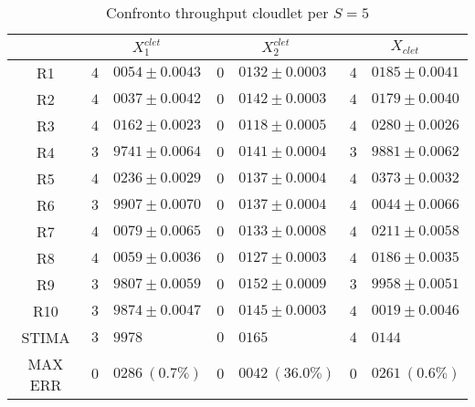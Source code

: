 \begin{table}[!h]
\begin{tabular}{c|r@{.}l|r@{.}l|r@{.}l}
& \multicolumn{2}{|c|}{$X_1^{clet}$}
& \multicolumn{2}{|c|}{$X_2^{clet}$}
& \multicolumn{2}{|c}{$X_{clet}$} 
\\          
\hline
R1      & $4$&$0054 \pm 0.0043$ & $0$&$0132 \pm 0.0003$ & $4$&$0185 \pm 0.0041$ \\
R2      & $4$&$0037 \pm 0.0042$ & $0$&$0142 \pm 0.0003$ & $4$&$0179 \pm 0.0040$ \\
R3      & $4$&$0162 \pm 0.0023$ & $0$&$0118 \pm 0.0005$ & $4$&$0280 \pm 0.0026$ \\
R4      & $3$&$9741 \pm 0.0064$ & $0$&$0141 \pm 0.0004$ & $3$&$9881 \pm 0.0062$ \\
R5      & $4$&$0236 \pm 0.0029$ & $0$&$0137 \pm 0.0004$ & $4$&$0373 \pm 0.0032$ \\
R6      & $3$&$9907 \pm 0.0070$ & $0$&$0137 \pm 0.0004$ & $4$&$0044 \pm 0.0066$ \\
R7      & $4$&$0079 \pm 0.0065$ & $0$&$0133 \pm 0.0008$ & $4$&$0211 \pm 0.0058$ \\
R8      & $4$&$0059 \pm 0.0036$ & $0$&$0127 \pm 0.0003$ & $4$&$0186 \pm 0.0035$ \\
R9      & $3$&$9807 \pm 0.0059$ & $0$&$0152 \pm 0.0009$ & $3$&$9958 \pm 0.0051$ \\
R10     & $3$&$9874 \pm 0.0047$ & $0$&$0145 \pm 0.0003$ & $4$&$0019 \pm 0.0046$ \\
STIMA   & $3$&$9978$            & $0$&$0165$            & $4$&$0144$            \\
MAX ERR & $0$&$0286 \ (0.7\%)$  & $0$&$0042 \ (36.0\%)$ & $0$&$0261 \ (0.6\%)$    
\end{tabular}
\centering
\caption{Confronto throughput cloudlet per $S=5$}
\label{tab:5_xclet}
\end{table}
